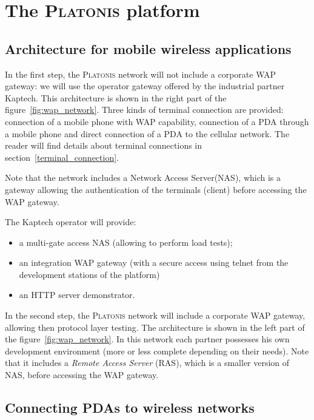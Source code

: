 \section{The \textsc{Platonis} platform}

\subsection{Architecture for mobile wireless applications}

In the first step, the \textsc{Platonis} network will not include a
corporate WAP gateway: we will use the operator gateway offered by
the industrial partner Kaptech. This architecture is shown in the
right part of the figure~\ref{fig:wap_network}. Three kinds of
terminal connection are provided: connection of a mobile phone
with WAP capability, connection of a PDA through a mobile phone
and direct connection of a PDA to the cellular network. The reader
will find details about terminal connections in
section~\ref{terminal_connection}.

Note that the network includes a Network Access Server(NAS), which 
is a gateway allowing the authentication of the terminals (client) 
before accessing the WAP gateway. 

The Kaptech operator will provide:

\begin{itemize}
\item a multi-gate access NAS (allowing to perform load tests);

\item an integration WAP gateway (with a secure access using
      \textsf{telnet} from the development stations of the platform)

\item an HTTP server demonstrator.

\end{itemize}

In the second step, the \textsc{Platonis} network will include a
corporate WAP gateway, allowing then protocol layer testing. 
The architecture is shown in the left part of the 
figure~\ref{fig:wap_network}. In this network each partner 
possesses his own development environment (more or less complete 
depending on their needs).  Note that it includes a \emph{Remote
Access Server} (RAS), which is a smaller version of NAS, before
accessing the WAP gateway.


\subsection{Connecting PDAs to wireless networks\label{terminal_connection}}

